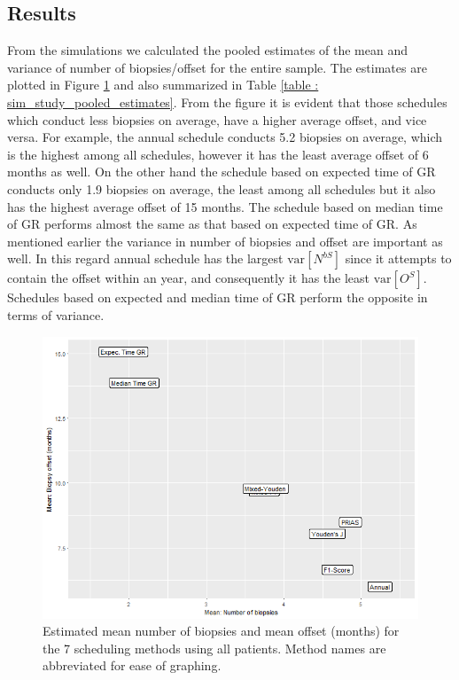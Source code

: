 \subsection{Results}
From the simulations we calculated the pooled estimates of the mean and variance of number of biopsies/offset for the entire sample. The estimates are plotted in Figure \ref{fig : meanNbVsOffset} and also summarized in Table \ref{table : sim_study_pooled_estimates}. From the figure it is evident that those schedules which conduct less biopsies on average, have a higher average offset, and vice versa. For example, the annual schedule conducts 5.2 biopsies on average, which is the highest among all schedules, however it has the least average offset of 6 months as well. On the other hand the schedule based on expected time of GR conducts only 1.9 biopsies on average, the least among all schedules but it also has the highest average offset of 15 months. The schedule based on median time of GR performs almost the same as that based on expected time of GR. As mentioned earlier the variance in number of biopsies and offset are important as well. In this regard annual schedule has the largest $\mbox{var}[N^{bS}]$ since it attempts to contain the offset within an year, and consequently it has the least $\mbox{var}[O^S]$. Schedules based on expected and median time of GR perform the opposite in terms of variance.

\begin{figure}
	\centerline{\includegraphics[width=\columnwidth]{images/sim_study/meanNbVsOffset_all.png}}
	\caption{Estimated mean number of biopsies and mean offset (months) for the 7 scheduling methods using all patients. Method names are abbreviated for ease of graphing.}
	\label{fig : meanNbVsOffset}
\end{figure}

